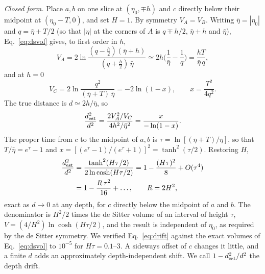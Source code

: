 \documentclass[prd,twocolumn,superscriptaddress,nofootinbib,amsmath,amssymb,floatfix]{revtex4-2}
\begin{document}
\emph{Closed form.} Place $a,b$ on one slice at $(\eta_0,\mp h)$ and $c$ directly below their midpoint at $(\eta_0-T,0)$, and set $H=1$. By symmetry $V_A=V_B$. Writing $\bar\eta=|\eta_0|$ and $q=\bar\eta+T/2$ (so that $|\eta|$ at the corners of $A$ is $q\mp h/2$, $\bar\eta+h$ and $\bar\eta$), Eq.~\eqref{eq:dsvol} gives, to first order in $h$,
\begin{equation}
V_A=2\ln\frac{(q-\tfrac h2)(\bar\eta+h)}{(q+\tfrac h2)\,\bar\eta}\simeq2h\Big(\frac{1}{\bar\eta}-\frac{1}{q}\Big)=\frac{hT}{\bar\eta\,q},
\end{equation}
and at $h=0$
\begin{equation}
V_C=2\ln\frac{q^2}{(\bar\eta+T)\,\bar\eta}=-2\ln(1-x),\qquad x=\frac{T^2}{4q^2}.
\end{equation}
The true distance is $d\simeq2h/\bar\eta$, so
\begin{equation}
\frac{d^2_{\rm est}}{d^2}=\frac{2V_A^2/V_C}{4h^2/\bar\eta^2}=\frac{x}{-\ln(1-x)}.
\end{equation}
The proper time from $c$ to the midpoint of $a,b$ is $\tau=\ln[(\bar\eta+T)/\bar\eta]$, so that $T/\bar\eta=e^{\tau}-1$ and $x=[(e^\tau-1)/(e^\tau+1)]^2=\tanh^2(\tau/2)$. Restoring $H$,
\begin{equation}
\begin{aligned}
\frac{d^2_{\rm est}}{d^2}&=\frac{\tanh^2(H\tau/2)}{2\ln\cosh(H\tau/2)}=1-\frac{(H\tau)^2}{8}+O(\tau^4)\\
&=1-\frac{R\,\tau^2}{16}+\dots,\qquad R=2H^2,
\end{aligned}
\label{eq:drift}
\end{equation}
exact as $d\to0$ at any depth, for $c$ directly below the midpoint of $a$ and $b$. The denominator is $H^2/2$ times the de Sitter volume of an interval of height $\tau$, $V=(4/H^2)\ln\cosh(H\tau/2)$, and the result is independent of $\eta_0$, as required by the de Sitter symmetry. We verified Eq.~\eqref{eq:drift} against the exact volumes of Eq.~\eqref{eq:dsvol} to $10^{-5}$ for $H\tau=0.1$--$3$. A sideways offset of $c$ changes it little, and a finite $d$ adds an approximately depth-independent shift. We call $1-d^2_{\rm est}/d^2$ the depth drift.
\end{document}
